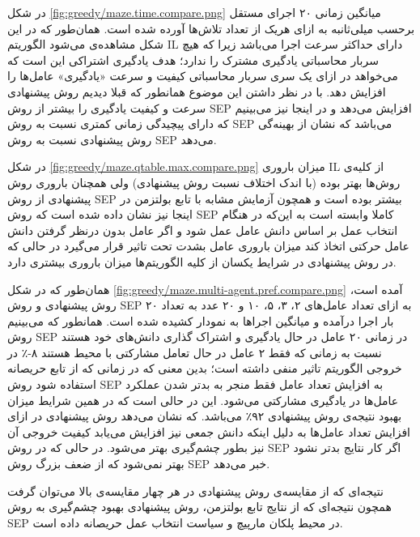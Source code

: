  در شکل
\ref{fig:greedy/maze.time.compare.png}
میانگین زمانی ۲۰ اجرای مستقل برحسب میلی‌ثانبه به ازای هریک از تعداد تلاش‌ها آورده شده است. همان‌طور که در این شکل مشاهده‌ی می‌شود الگوریتم IL دارای حداکثر سرعت اجرا می‌باشد زیرا که هیچ سربار محاسباتی یادگیری مشترک را ندارد؛ هدف یادگیری اشتراکی این است که می‌خواهد در ازای یک سری سربار محاسباتی کیفیت و سرعت «یادگیری» عامل‌ها را افزایش دهد. با در نظر داشتن این موضوع همانطور که قبلا دیدیم روش پیشنهادی سرعت و کیفیت یادگیری را بیشتر از روش SEP افزایش می‌دهد و در اینجا نیز می‌بینیم که دارای پیچیدگی زمانی کمتری نسبت به روش SEP می‌باشد که نشان از بهینه‌گی روش پیشنهادی نسبت به روش SEP می‌دهد.


در شکل
\ref{fig:greedy/maze.qtable.max.compare.png}
میزان باروری IL از کلیه‌ی روش‌ها بهتر بوده (با اندک اختلاف نسبت روش پیشنهادی) ولی همچنان باروری روش پیشنهادی از روش SEP بیشتر بوده است و همچون آزمایش مشابه با تابع بولتزمن در اینجا نیز نشان داده شده است که روش SEP کاملا وابسته است به این‌که در هنگام انتخاب عمل بر اساس دانش عامل عمل شود و اگر عامل بدون درنظر گرفتن دانش عامل حرکتی اتخاذ کند میزان باروری عامل بشدت تحت تاثیر قرار می‌گیرد در حالی که در روش پیشنهادی در شرایط یکسان از کلیه الگوریتم‌ها میزان باروری بیشتری دارد.


 همان‌طور که در شکل
\ref{fig:greedy/maze.multi-agent.pref.compare.png}
آمده است، روش پیشنهادی و روش SEP به ازای تعداد عامل‌های ۲، ۳، ۵، ۱۰ و ۲۰ عدد به تعداد ۲۰ بار اجرا درآمده و میانگین اجراها به نمودار کشیده شده است. همانطور که می‌بینیم روش SEP در زمانی ۲۰ عامل در حال یادگیری و اشتراک گذاری دانش‌های خود هستند نسبت به زمانی که فقط ۲ عامل در حال تعامل مشارکتی با محیط هستند ۸-٪ در خروجی الگوریتم تاثیر منفی داشته است؛ بدین معنی که در زمانی که از تابع حریصانه استفاده شود روش SEP به افزایش تعداد عامل فقط منجر به بدتر شدن عملکرد عامل‌ها در یادگیری مشارکتی می‌شود. این در حالی است که در همین شرایط میزان بهبود نتیجه‌ی روش پیشنهادی ۹۲٪ می‌باشد. که نشان می‌دهد روش پیشنهادی در ازای افزایش تعداد عامل‌ها به دلیل اینکه دانش جمعی نیز افزایش می‌یابد کیفیت خروجی آن نیز بطور چشم‌گیری بهتر می‌شود. در حالی که در روش SEP اگر کار نتایج بدتر نشود بهتر نمی‌شود که از ضعف بزرگ روش SEP خبر می‌دهد.


 نتیجه‌ای که از مقایسه‌ی روش پیشنهادی در هر چهار مقایسه‌ی بالا می‌توان گرفت همچون نتیجه‌ای که از نتایج تابع بولتزمن، روش پیشنهادی بهبود چشم‌گیری به روش SEP در محیط پلکان مارپیچ و سیاست انتخاب عمل حریصانه داده است.